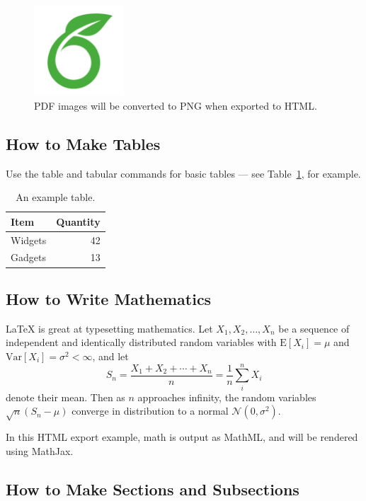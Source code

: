 \documentclass[a4paper,11pt]{article}
\begin{document}
\begin{figure}
\centering
\includegraphics[width=0.3\textwidth]{overleaf}
\caption{PDF images will be converted to PNG when exported to HTML.}
\end{figure}

\subsection{How to Make Tables}

Use the table and tabular commands for basic tables --- see Table~\ref{tab:widgets}, for example.

\begin{table}
\centering
\begin{tabular}{l|r}
Item & Quantity \\\hline
Widgets & 42 \\
Gadgets & 13
\end{tabular}
\caption{\label{tab:widgets}An example table.}
\end{table}

\subsection{How to Write Mathematics}

\LaTeX{} is great at typesetting mathematics. Let $X_1, X_2, \ldots, X_n$ be a sequence of independent and identically distributed random variables with $\text{E}[X_i] = \mu$ and $\text{Var}[X_i] = \sigma^2 < \infty$, and let
$$S_n = \frac{X_1 + X_2 + \cdots + X_n}{n}
      = \frac{1}{n}\sum_{i}^{n} X_i$$
denote their mean. Then as $n$ approaches infinity, the random variables $\sqrt{n}(S_n - \mu)$ converge in distribution to a normal $\mathcal{N}(0, \sigma^2)$.

In this HTML export example, math is output as MathML, and will be rendered using MathJax.

\subsection{How to Make Sections and Subsections}
\end{document}
